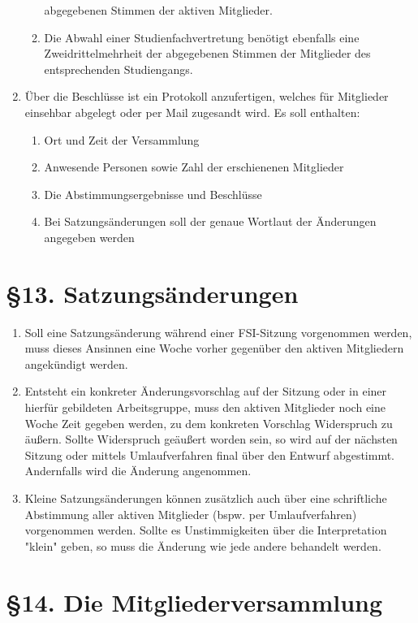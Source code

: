\documentclass[12pt]{article}
\begin{document}
\begin{enumerate}
\begin{enumerate}[label=(\roman*)]
		abgegebenen Stimmen der aktiven Mitglieder.
		\item
			Die Abwahl einer Studienfachvertretung benötigt
			ebenfalls eine Zweidrittelmehrheit der
			abgegebenen Stimmen der Mitglieder des
			entsprechenden Studiengangs.
	\end{enumerate}
	\item
	Über die Beschlüsse ist ein Protokoll anzufertigen, welches für
	Mitglieder einsehbar abgelegt oder per Mail zugesandt wird.
	Es soll enthalten:
	\begin{enumerate}[label=(\roman*)]
		\item
		Ort und Zeit der Versammlung
		\item
		Anwesende Personen sowie Zahl der erschienenen
		Mitglieder
		\item
		Die Abstimmungsergebnisse und Beschlüsse
		\item
		Bei Satzungsänderungen soll der genaue Wortlaut
		der Änderungen angegeben werden
	\end{enumerate}
\end{enumerate}
\section*{§13. Satzungsänderungen}
\begin{enumerate}
	\item
	Soll eine Satzungsänderung während einer FSI-Sitzung
	vorgenommen werden, muss dieses Ansinnen eine Woche vorher
	gegenüber den aktiven Mitgliedern angekündigt werden.
	\item
	Entsteht ein konkreter Änderungsvorschlag auf der Sitzung oder in
	einer hierfür gebildeten Arbeitsgruppe, muss den aktiven
	Mitglieder noch eine Woche Zeit gegeben werden, zu dem konkreten
	Vorschlag Widerspruch zu äußern.
	Sollte Widerspruch geäußert worden sein, so wird auf der
	nächsten Sitzung oder mittels Umlaufverfahren final über den
	Entwurf abgestimmt. Andernfalls wird die Änderung angenommen.
	\item
	Kleine Satzungsänderungen können zusätzlich
	auch über eine schriftliche Abstimmung aller
	aktiven Mitglieder (bspw. per Umlaufverfahren)
	vorgenommen werden. Sollte es Unstimmigkeiten über die
	Interpretation "klein" geben, so muss die Änderung wie jede
	andere behandelt werden.
\end{enumerate}



\section*{§14. Die Mitgliederversammlung}
\end{document}
